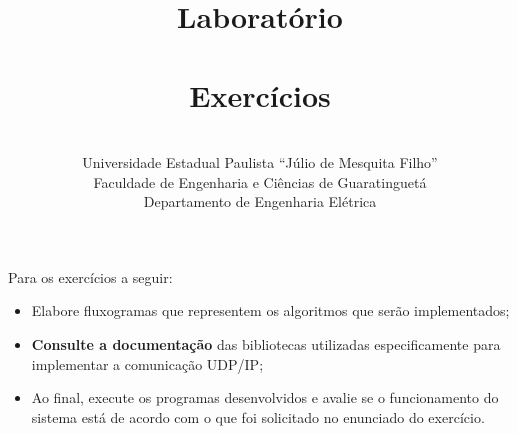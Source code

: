 \documentclass[12pt]{article}
\title{Laboratório \labnumber \\ \doctitle \\ \vspace{0.6cm} Exercícios}
\author{\docsubj \\
  {\small Universidade Estadual Paulista ``Júlio de Mesquita Filho''} \\
  {\small Faculdade de Engenharia e Ciências de Guaratinguetá} \\
  {\small Departamento de Engenharia Elétrica}}
\date{}
\begin{document}
\maketitle


Para os exercícios a seguir:

\begin{itemize}
  \item Elabore fluxogramas que representem os algoritmos que serão implementados;
  \item \textbf{Consulte a documentação} das bibliotecas utilizadas especificamente
    para implementar a comunicação UDP/IP;
  \item Ao final, execute os programas desenvolvidos e avalie se o funcionamento do
    sistema está de acordo com o que foi solicitado no enunciado do exercício.
\end{itemize}

\vspace{12pt}
\end{document}
